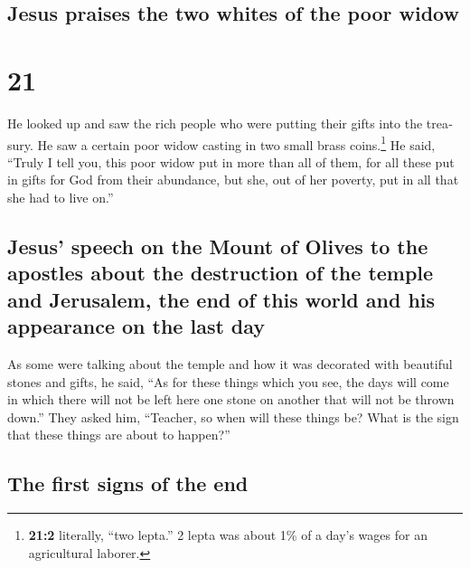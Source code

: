 \begin{paracol}{2}
\begin{otherlanguage}{english}
\begin{otherlanguage}{english}
\hypertarget{jesus-praises-the-two-whites-of-the-poor-widow}{%
\subsection{Jesus praises the two whites of the poor
widow}\label{jesus-praises-the-two-whites-of-the-poor-widow}}

\hypertarget{section-24}{%
\section{21}\label{section-24}}

 He looked up and saw the rich people who were putting
their gifts into the treasury.  He saw a certain poor
widow casting in two small brass coins.\footnote{\textbf{21:2}
  literally, ``two lepta.'' 2 lepta was about 1\% of a day's wages for
  an agricultural laborer.}  He said, ``Truly I tell you,
this poor widow put in more than all of them,  for all
these put in gifts for God from their abundance, but she, out of her
poverty, put in all that she had to live on.''

\hypertarget{jesus-speech-on-the-mount-of-olives-to-the-apostles-about-the-destruction-of-the-temple-and-jerusalem-the-end-of-this-world-and-his-appearance-on-the-last-day}{%
\subsection{Jesus' speech on the Mount of Olives to the apostles about
the destruction of the temple and Jerusalem, the end of this world and
his appearance on the last
day}\label{jesus-speech-on-the-mount-of-olives-to-the-apostles-about-the-destruction-of-the-temple-and-jerusalem-the-end-of-this-world-and-his-appearance-on-the-last-day}}

 As some were talking about the temple and how it was
decorated with beautiful stones and gifts, he said,  ``As
for these things which you see, the days will come in which there will
not be left here one stone on another that will not be thrown down.''
 They asked him, ``Teacher, so when will these things be?
What is the sign that these things are about to happen?''

\hypertarget{the-first-signs-of-the-end}{%
\subsection{The first signs of the
end}\label{the-first-signs-of-the-end}}


\end{otherlanguage}
\end{otherlanguage}
\end{paracol}
